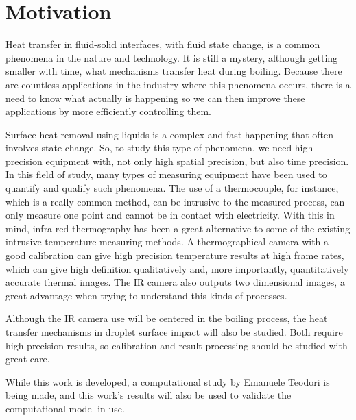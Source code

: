 \section{Motivation}
\label{sec:int_motivation}

\par Heat transfer in fluid-solid interfaces, with fluid state change, is a common phenomena in the nature and technology. It is still a mystery, although getting smaller with time, what mechanisms transfer heat during boiling. Because there are countless applications in the industry where this phenomena occurs, there is a need to know what actually is happening so we can then improve these applications by more efficiently controlling them. \\
\par Surface heat removal using liquids is a complex and fast happening that often involves state change. So, to study this type of phenomena, we need high precision equipment with, not only high spatial precision, but also time precision. In this field of study, many types of measuring equipment have been used to quantify and qualify such phenomena. The use of a thermocouple, for instance, which is a really common method, can be intrusive to the measured process, can only measure one point and cannot be in contact with electricity. With this in mind, infra-red thermography has been a great alternative to some of the existing intrusive temperature measuring methods. A thermographical camera with a good calibration can give high precision temperature results at high frame rates, which can give high definition qualitatively and, more importantly, quantitatively accurate thermal images. The IR camera also outputs two dimensional images, a great advantage when trying to understand this kinds of processes. \\
\par Although the IR camera use will be centered in the boiling process, the heat transfer mechanisms in droplet surface impact will also be studied. Both require high precision results, so calibration and result processing should be studied with great care. \\
\par While this work is developed, a computational study by Emanuele Teodori is being made, and this work's results will also be used to validate the computational model in use.